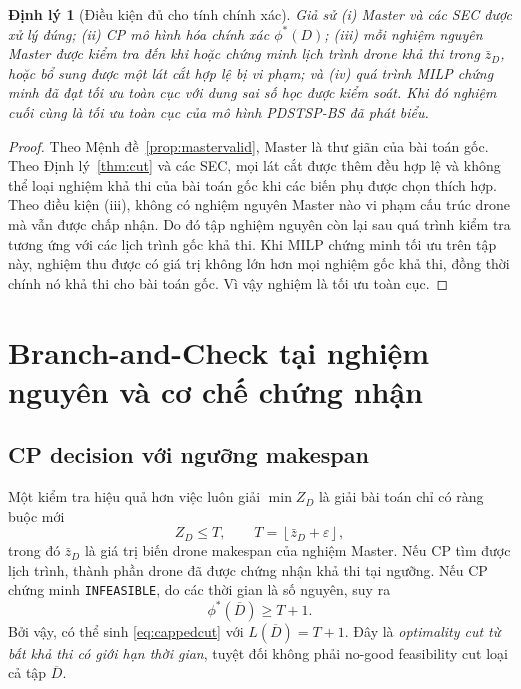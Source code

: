 \documentclass[11pt,a4paper]{article}
\theoremstyle{definition}
\theoremstyle{plain}
\newtheorem{theorem}{Định lý}[section]
\theoremstyle{remark}
\newcommand{\opt}{\phi^*}
\newcommand{\barD}{\overline D}
\begin{document}
\begin{theorem}[Điều kiện đủ cho tính chính xác]\label{thm:exact}
Giả sử (i) Master và các SEC được xử lý đúng; (ii) CP mô hình hóa chính xác $\opt(D)$; (iii) mỗi nghiệm nguyên Master được kiểm tra đến khi hoặc chứng minh lịch trình drone khả thi trong $\bar z_D$, hoặc bổ sung được một lát cắt hợp lệ bị vi phạm; và (iv) quá trình MILP chứng minh đã đạt tối ưu toàn cục với dung sai số học được kiểm soát. Khi đó nghiệm cuối cùng là tối ưu toàn cục của mô hình PDSTSP-BS đã phát biểu.
\end{theorem}
\begin{proof}
Theo Mệnh đề~\ref{prop:mastervalid}, Master là thư giãn của bài toán gốc. Theo Định lý~\ref{thm:cut} và các SEC, mọi lát cắt được thêm đều hợp lệ và không thể loại nghiệm khả thi của bài toán gốc khi các biến phụ được chọn thích hợp. Theo điều kiện (iii), không có nghiệm nguyên Master nào vi phạm cấu trúc drone mà vẫn được chấp nhận. Do đó tập nghiệm nguyên còn lại sau quá trình kiểm tra tương ứng với các lịch trình gốc khả thi. Khi MILP chứng minh tối ưu trên tập này, nghiệm thu được có giá trị không lớn hơn mọi nghiệm gốc khả thi, đồng thời chính nó khả thi cho bài toán gốc. Vì vậy nghiệm là tối ưu toàn cục.
\end{proof}


\section{Branch-and-Check tại nghiệm nguyên và cơ chế chứng nhận}
\label{sec:actualbc}
\subsection{CP decision với ngưỡng makespan}
Một kiểm tra hiệu quả hơn việc luôn giải $\min Z_D$ là giải bài toán chỉ có ràng buộc mới
\begin{equation}\label{eq:deadline}
Z_D\le T,\qquad T=\left\lfloor\bar z_D+\varepsilon\right\rfloor,
\end{equation}
trong đó $\bar z_D$ là giá trị biến drone makespan của nghiệm Master. Nếu CP tìm được lịch trình, thành phần drone đã được chứng nhận khả thi tại ngưỡng. Nếu CP chứng minh \texttt{INFEASIBLE}, do các thời gian là số nguyên, suy ra
\begin{equation}\label{eq:decisionlb}
\opt(\barD)\ge T+1.
\end{equation}
Bởi vậy, có thể sinh \eqref{eq:cappedcut} với $L(\barD)=T+1$. Đây là \emph{optimality cut từ bất khả thi có giới hạn thời gian}, tuyệt đối không phải no-good feasibility cut loại cả tập $\barD$.
\end{document}
